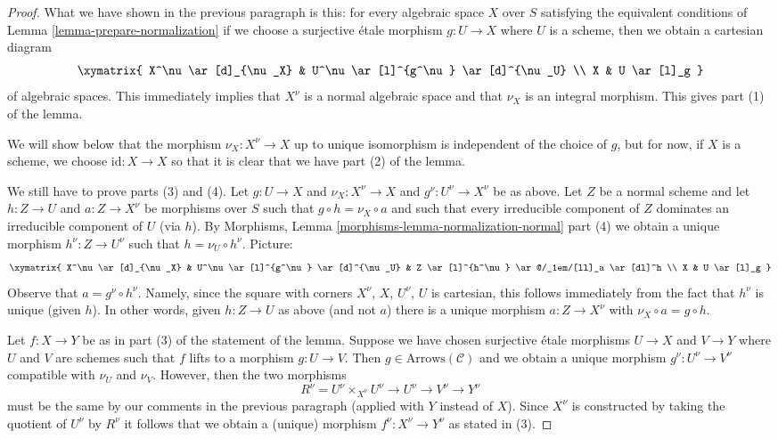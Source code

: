\begin{proof}
\medskip\noindent
What we have shown in the previous paragraph is this: for every algebraic
space $X$ over $S$ satisfying the equivalent conditions of
Lemma \ref{lemma-prepare-normalization} if we choose a surjective \'etale
morphism $g : U \to X$ where $U$ is a scheme, then we obtain
a cartesian diagram
$$
\xymatrix{
X^\nu \ar[d]_{\nu_X} & U^\nu \ar[l]^{g^\nu} \ar[d]^{\nu_U} \\
X & U \ar[l]_g
}
$$
of algebraic spaces. This immediately implies that $X^\nu$ is a normal
algebraic space and that $\nu_X$ is an integral morphism. This gives
part (1) of the lemma.

\medskip\noindent
We will show below that the morphism $\nu_X : X^\nu \to X$
up to unique isomorphism is independent of the choice of $g$,
but for now, if $X$ is a scheme, we choose $\text{id} : X \to X$
so that it is clear that we have part (2) of the lemma.

\medskip\noindent
We still have to prove parts (3) and (4). Let $g : U \to X$ and
$\nu_X : X^\nu \to X$ and $g^\nu : U^\nu \to X^\nu$ be as above.
Let $Z$ be a normal scheme and let $h : Z \to U$ and $a : Z \to X^\nu$
be morphisms over $S$ such that $g \circ h = \nu_X \circ a$ and such that
every irreducible component of $Z$ dominates an irreducible component of $U$
(via $h$). By
Morphisms, Lemma \ref{morphisms-lemma-normalization-normal} part (4)
we obtain a unique morphism $h^\nu : Z \to U^\nu$ such
that $h = \nu_U \circ h^\nu$. Picture:
$$
\xymatrix{
X^\nu \ar[d]_{\nu_X} &
U^\nu \ar[l]^{g^\nu} \ar[d]^{\nu_U} &
Z \ar[l]^{h^\nu} \ar@/_1em/[ll]_a \ar[dl]^h
\\
X & U \ar[l]_g
}
$$
Observe that $a = g^\nu \circ h^\nu$. Namely, since the square with
corners $X^\nu$, $X$, $U^\nu$, $U$ is cartesian, this follows
immediately from the fact that $h^\nu$ is unique (given $h$).
In other words, given $h : Z \to U$ as above (and not $a$)
there is a unique morphism $a : Z \to X^\nu$ with
$\nu_X \circ a = g \circ h$.

\medskip\noindent
Let $f : X \to Y$ be as in part (3) of the statement of the lemma.
Suppose we have chosen surjective \'etale morphisms $U \to X$ and
$V \to Y$ where $U$ and $V$ are schemes such that $f$ lifts to a
morphism $g : U \to V$. Then $g \in \text{Arrows}(\mathcal{C})$
and we obtain a unique morphism $g^\nu : U^\nu \to V^\nu$ compatible
with $\nu_U$ and $\nu_V$. However, then the two morphisms
$$
R^\nu = U^\nu \times_{X^\nu} U^\nu
\to U^\nu \to V^\nu \to Y^\nu
$$
must be the same by our comments in the previous paragraph (applied
with $Y$ instead of $X$).
Since $X^\nu$ is constructed by taking the quotient of
$U^\nu$ by $R^\nu$ it follows that we obtain a (unique)
morphism $f^\nu : X^\nu \to Y^\nu$ as stated in (3).


\end{proof}
